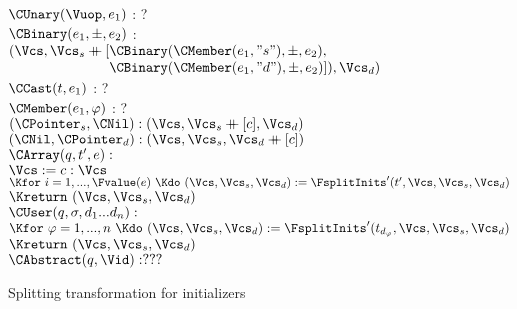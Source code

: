 \begin{docpart}
\begin{figure}[htbp]
\begin{center}
{{\begin{pseudocode}
                   $\CUnary(\Vuop, e_1)$ \> : \> ? \\
                   $\CBinary(e_1, \pm, e_2)$ \> : \>
                     $(\Vcs, \Vcs_s \append 
                        [
                        \begin{array}[t]{@{}l@{}}
                          \CBinary(\CMember(e_1, "s"), \pm, e_2), \\
                          \CBinary(\CMember(e_1, "d"), \pm, e_2)]),
                          \Vcs_d)
                        \end{array}$ \\
                   $\CCast(t, e_1)$ \> : \> ? \\
                   $\CMember(e_1, \varphi)$ \> : \> ? \-\-\\
               $(\CPointer_s, \CNil) :
                  (\Vcs, \Vcs_s \append [c], \Vcs_d)$ \\
               $(\CNil, \CPointer_d) :
                  (\Vcs, \Vcs_s, \Vcs_d \append [c])$ \-\-
             \\[1ex]
           $\CArray(q,t',e) : {}$ \+\\
             $\Vcs := c:\Vcs$\\
             $\Kfor\ i = 1, ..., \Fvalue(e)\ \Kdo\
               (\Vcs, \Vcs_s, \Vcs_d) := 
                 \FsplitInits'(t', \Vcs, \Vcs_s, \Vcs_d)$ \\
             $\Kreturn\ (\Vcs, \Vcs_s, \Vcs_d)$ 
             \-\\[1ex]
           $\CUser(q, \sigma, d_1 ... d_n) : {}$ \+\\
             $\Kfor\ \varphi = 1, ..., n\ \Kdo\
               (\Vcs, \Vcs_s, \Vcs_d) := 
                 \FsplitInits'(t_{d_\varphi}, \Vcs, \Vcs_s, \Vcs_d)$ \\
             $\Kreturn\ (\Vcs, \Vcs_s, \Vcs_d)$ 
             \-\\[1ex]
           $\CAbstract(q, \Vid) : ???$
    \end{pseudocode}}}
    \caption{Splitting transformation for \coreC initializers}
    \label{fig:PDSSplitInitializers}
  \end{center}
\end{figure}%
\begin{figure}[htbp]
  \begin{center}\leavevmode\hbox{\vbox{%
}}
\end{center}
\end{figure}
\end{docpart}
